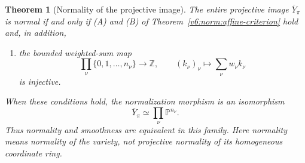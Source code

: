 \documentclass[10pt,fleqn]{article}
\numberwithin{equation}{section}
\newtheorem{theorem}{Theorem}[section]
\newcommand{\PP}{\mathbb P}
\begin{document}
\begin{theorem}[Normality of the projective image]
\label{v6:norm:projective-criterion}
The entire projective image $\overline Y_\pi$ is normal if and only
if (A) and (B) of Theorem~\ref{v6:norm:affine-criterion} hold and,
in addition,
\begin{enumerate}[label=\textup{(\Alph*)},start=3,leftmargin=*]
\item the bounded weighted-sum map
\begin{equation}\label{v6:norm:endpoint-injectivity}
 \prod_\nu\{0,1,\ldots,n_\nu\}\longrightarrow\mathbb Z,
 \qquad (k_\nu)_\nu\longmapsto\sum_\nu w_\nu k_\nu
\end{equation}
is injective.
\end{enumerate}
When these conditions hold, the normalization morphism is an
isomorphism
\[
 \overline Y_\pi\simeq\prod_\nu\PP^{n_\nu}.
\]
Thus normality and smoothness are equivalent in this family.  Here
normality means normality of the variety, not projective normality
of its homogeneous coordinate ring.
\end{theorem}
\end{document}
